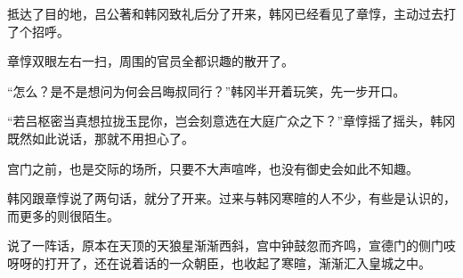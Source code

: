 抵达了目的地，吕公著和韩冈致礼后分了开来，韩冈已经看见了章惇，主动过去打了个招呼。

章惇双眼左右一扫，周围的官员全都识趣的散开了。

“怎么？是不是想问为何会吕晦叔同行？”韩冈半开着玩笑，先一步开口。

“若吕枢密当真想拉拢玉昆你，岂会刻意选在大庭广众之下？”章惇摇了摇头，韩冈既然如此说话，那就不用担心了。

宫门之前，也是交际的场所，只要不大声喧哗，也没有御史会如此不知趣。

韩冈跟章惇说了两句话，就分了开来。过来与韩冈寒暄的人不少，有些是认识的，而更多的则很陌生。

说了一阵话，原本在天顶的天狼星渐渐西斜，宫中钟鼓忽而齐鸣，宣德门的侧门吱呀呀的打开了，还在说着话的一众朝臣，也收起了寒暄，渐渐汇入皇城之中。

